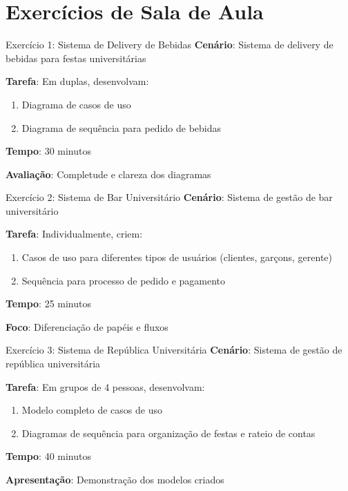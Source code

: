 \documentclass[aspectratio=169]{beamer}
\begin{document}
\section{Exercícios de Sala de Aula}

\begin{frame}{Exercício 1: Sistema de Delivery de Bebidas}
\textbf{Cenário}: Sistema de delivery de bebidas para festas universitárias

\textbf{Tarefa}: Em duplas, desenvolvam:
\begin{enumerate}
\item Diagrama de casos de uso
\item Diagrama de sequência para pedido de bebidas
\end{enumerate}

\vspace{0.5cm}
\textbf{Tempo}: 30 minutos

\vspace{0.5cm}
\textbf{Avaliação}: Completude e clareza dos diagramas
\end{frame}

\begin{frame}{Exercício 2: Sistema de Bar Universitário}
\textbf{Cenário}: Sistema de gestão de bar universitário

\textbf{Tarefa}: Individualmente, criem:
\begin{enumerate}
\item Casos de uso para diferentes tipos de usuários (clientes, garçons, gerente)
\item Sequência para processo de pedido e pagamento
\end{enumerate}

\vspace{0.5cm}
\textbf{Tempo}: 25 minutos

\vspace{0.5cm}
\textbf{Foco}: Diferenciação de papéis e fluxos
\end{frame}

\begin{frame}{Exercício 3: Sistema de República Universitária}
\textbf{Cenário}: Sistema de gestão de república universitária

\textbf{Tarefa}: Em grupos de 4 pessoas, desenvolvam:
\begin{enumerate}
\item Modelo completo de casos de uso
\item Diagramas de sequência para organização de festas e rateio de contas
\end{enumerate}

\vspace{0.5cm}
\textbf{Tempo}: 40 minutos

\vspace{0.5cm}
\textbf{Apresentação}: Demonstração dos modelos criados
\end{frame}
\end{document}
